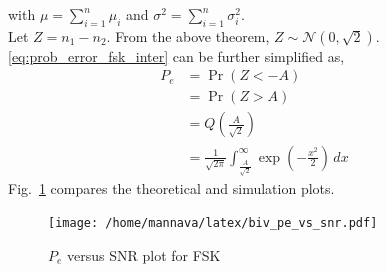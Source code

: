 \documentclass[journal,10pt,twocolumn]{IEEEtran}
\newcommand\figref{Fig.~\ref}
\providecommand{\pr}[1]{\ensuremath{\Pr\left(#1\right)}}
\providecommand{\qfunc}[1]{\ensuremath{Q\left(#1\right)}}
\providecommand{\gauss}[2]{\mathcal{N}\ensuremath{\left(#1,#2\right)}}
\begin{document}
\begin{enumerate}
with $\mu =\sum_{i=1}^n \mu_i$ and $\sigma^2 = \sum_{i=1}^n \sigma_i^2$.\\
Let $Z=n_1-n_2$. From the above theorem, $Z \sim \gauss{0}{\sqrt{2}}$. \eqref{eq:prob_error_fsk_inter} can be further simplified as,
\begin{align*}
	P_e &= \pr{Z < -A}&\\
	&= \pr{Z > A}&\\
	&= \qfunc{\frac{A}{\sqrt{2}}}&\\
	&= \frac{1}{\sqrt{2\pi}}\int_{\frac{A}{\sqrt{2}}}^{\infty} \exp\left(-\frac{x^2}{2}\right)  \,dx 
\end{align*}
\figref{fig:biv_pe_snr} compares the theoretical and simulation plots.

\begin{figure}[H]
\centering
\texttt{[image: /home/mannava/latex/biv\_pe\_vs\_snr.pdf]}
\caption{$P_e$ versus SNR plot for FSK}
\label{fig:biv_pe_snr}
\end{figure}
%
\end{enumerate}
\end{document}
